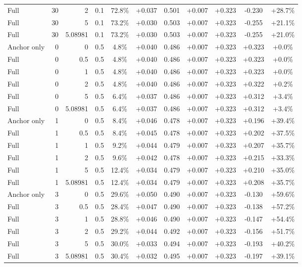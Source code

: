 \begin{table}[htbp]
\begin{tabular}{lrrrccccccc}
Full & 30 & 2 & 0.1 & 72.8\% & +0.037 & 0.501 & +0.007 & +0.323 & -0.230 & +28.7\% \\
Full & 30 & 5 & 0.1 & 73.2\% & +0.030 & 0.503 & +0.007 & +0.323 & -0.255 & +21.1\% \\
Full & 30 & 5.08981 & 0.1 & 73.2\% & +0.030 & 0.503 & +0.007 & +0.323 & -0.255 & +21.0\% \\
Anchor only & 0 & 0 & 0.5 & 4.8\% & +0.040 & 0.486 & +0.007 & +0.323 & +0.323 & +0.0\% \\
Full & 0 & 0.5 & 0.5 & 4.8\% & +0.040 & 0.486 & +0.007 & +0.323 & +0.323 & +0.0\% \\
Full & 0 & 1 & 0.5 & 4.8\% & +0.040 & 0.486 & +0.007 & +0.323 & +0.323 & +0.0\% \\
Full & 0 & 2 & 0.5 & 4.8\% & +0.040 & 0.486 & +0.007 & +0.323 & +0.322 & +0.2\% \\
Full & 0 & 5 & 0.5 & 6.4\% & +0.037 & 0.486 & +0.007 & +0.323 & +0.312 & +3.4\% \\
Full & 0 & 5.08981 & 0.5 & 6.4\% & +0.037 & 0.486 & +0.007 & +0.323 & +0.312 & +3.4\% \\
Anchor only & 1 & 0 & 0.5 & 8.4\% & +0.046 & 0.478 & +0.007 & +0.323 & +0.196 & +39.4\% \\
Full & 1 & 0.5 & 0.5 & 8.4\% & +0.045 & 0.478 & +0.007 & +0.323 & +0.202 & +37.5\% \\
Full & 1 & 1 & 0.5 & 9.2\% & +0.044 & 0.479 & +0.007 & +0.323 & +0.207 & +35.7\% \\
Full & 1 & 2 & 0.5 & 9.6\% & +0.042 & 0.478 & +0.007 & +0.323 & +0.215 & +33.3\% \\
Full & 1 & 5 & 0.5 & 12.4\% & +0.034 & 0.479 & +0.007 & +0.323 & +0.210 & +35.0\% \\
Full & 1 & 5.08981 & 0.5 & 12.4\% & +0.034 & 0.479 & +0.007 & +0.323 & +0.208 & +35.7\% \\
Anchor only & 3 & 0 & 0.5 & 29.6\% & +0.050 & 0.490 & +0.007 & +0.323 & -0.130 & +59.6\% \\
Full & 3 & 0.5 & 0.5 & 28.4\% & +0.047 & 0.490 & +0.007 & +0.323 & -0.138 & +57.2\% \\
Full & 3 & 1 & 0.5 & 28.8\% & +0.046 & 0.490 & +0.007 & +0.323 & -0.147 & +54.4\% \\
Full & 3 & 2 & 0.5 & 29.2\% & +0.044 & 0.492 & +0.007 & +0.323 & -0.156 & +51.7\% \\
Full & 3 & 5 & 0.5 & 30.0\% & +0.033 & 0.494 & +0.007 & +0.323 & -0.193 & +40.2\% \\
Full & 3 & 5.08981 & 0.5 & 30.4\% & +0.032 & 0.495 & +0.007 & +0.323 & -0.197 & +39.1\% \\

\end{tabular}
\end{table}
